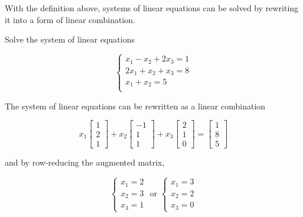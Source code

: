 \documentclass[a4paper,12pt]{article}
\begin{document}
With the definition above, systems of linear equations can be solved by rewriting it into a form of linear combination.

\begin{exm}
  Solve the system of linear equations

  $$\begin{cases}
    x_{1}-x_{2}+2x_{3}=1\\
    2x_{1}+x_{2}+x_{3}=8\\
    x_{1}+x_{2}=5\\
  \end{cases}$$\s

  \ans The system of linear equations can be rewritten as a linear combination

  $$x_{1}\begin{bmatrix}
    1\\
    2\\
    1
  \end{bmatrix}+x_{2}\begin{bmatrix}
    -1\\
    1\\
    1
  \end{bmatrix}+x_{3}\begin{bmatrix}
    2\\
    1\\
    0
  \end{bmatrix}=\begin{bmatrix}
    1\\
    8\\
    5
  \end{bmatrix}$$\s

  and by row-reducing the augmented matrix,

  $$\begin{cases}
    x_{1}=2\\
    x_{2}=3\\
    x_{3}=1
  \end{cases}\text{ or }\begin{cases}
    x_{1}=3\\
    x_{2}=2\\
    x_{3}=0
  \end{cases}$$
\end{exm}\n
\end{document}
